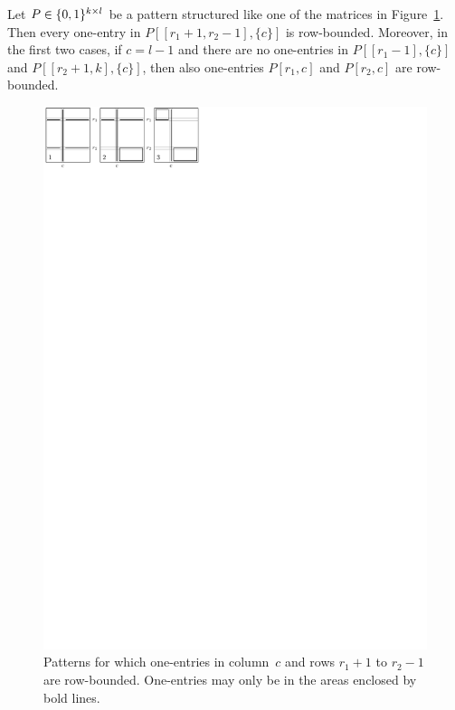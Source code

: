 \begin{lemma}
\label{lemma:I}
Let $P\in\{0,1\}^{k\times l}$ be a pattern structured like one of the matrices in Figure~\ref{fig:lemmaI}. Then every one-entry in $P[[r_1+1,r_2-1],\{c\}]$ is row-bounded. Moreover, in the first two cases, if $c=l-1$ and there are no one-entries in $P[[r_1-1],\{c\}]$ and $P[[r_2+1,k],\{c\}]$, then also one-entries $P[r_1,c]$ and $P[r_2,c]$ are row-bounded.

\begin{figure}[!ht]
\centering
\includegraphics[width=120mm]{img/lemmaI.pdf}
\caption{Patterns for which one-entries in column~$c$ and rows $r_1+1$ to $r_2-1$ are row-bounded. One-entries may only be in the areas enclosed by bold lines.}
\label{fig:lemmaI}
\end{figure}
\end{lemma}
